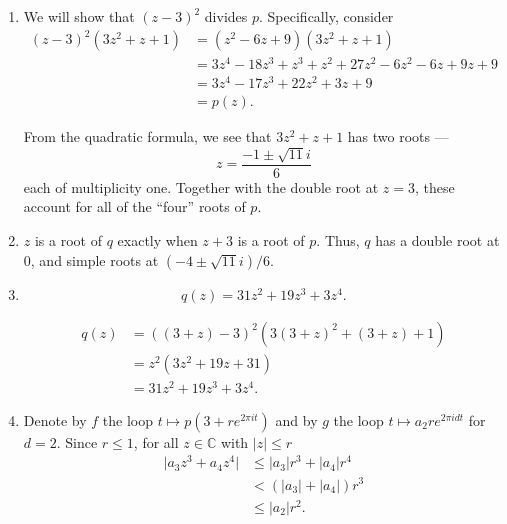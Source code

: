 \documentclass[12 pt, letterpaper]{hmcpset}
\begin{document}
\begin{solution}
	\begin{enumerate}
		\item We will show that $(z - 3)^{2}$ divides $p$. Specifically, consider
			\begin{align*}
				(z - 3)^{2} (3 z^{2} + z + 1) & = (z^{2} - 6 z + 9) (3z^{2} + z + 1) \\
							      & = 3 z^{4} - 18 z^{3} + z^{3} + z^{2} + 27 z^{2} - 6 z^{2} - 6z + 9z + 9 \\
							      & = 3 z^{4} - 17 z^{3} + 22 z^{2} + 3 z + 9 \\
							      & = p(z).
			\end{align*}

			From the quadratic formula, we see that $3z^{2} + z + 1$ has two roots ---
			\[
				z = \frac{-1 \pm \sqrt{11} i}{6}
			\]
			each of multiplicity one. Together with the double root at $z = 3$, these account for all of the ``four'' roots of $p$.
		\item $z$ is a root of $q$ exactly when $z + 3$ is a root of $p$. Thus, $q$ has a double root at $0$, and simple roots at $(-4 \pm \sqrt{11} i)/6$.
		\item
			\[
				\boxed{
					q(z) = 31 z^{2} + 19 z^{3} + 3 z^{4}.
				}
			\]

			
			\begin{align*}
				q(z) & = ((3 + z) - 3)^{2} (3 (3 + z)^{2} + (3 + z) + 1) \\
				     & = z^{2} (3 z^{2} + 19 z + 31) \\
				     & = 31 z^{2} + 19 z^{3} + 3 z^{4}.
			\end{align*}
		\item Denote by $f$ the loop $t \mapsto p(3 + r e^{2 \pi i t})$ and by $g$ the loop $t \mapsto a_{2} r e^{2 \pi i d t}$ for $d = 2$. Since $r \le 1$, for all $z \in \mathbb{C}$ with $\lvert z \rvert \le r$
			\begin{align*}
				\lvert a_{3} z^{3} + a_{4} z^{4} \rvert & \le \lvert a_{3} \rvert r^{3} + \lvert a_{4} \rvert r^{4} \\
									& < ( \lvert a_{3} \rvert + \lvert a_{4} \rvert ) r^{3} \\
									& \le \lvert a_{2} \rvert r^{2}.
			\end{align*}


\end{enumerate}
\end{solution}
\end{document}

